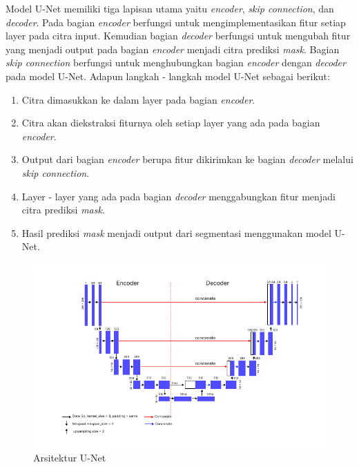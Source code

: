 
Model U-Net memiliki tiga lapisan utama yaitu \textit{encoder}, \textit{skip connection}, dan \textit{decoder}. Pada bagian \textit{encoder} berfungsi untuk mengimplementasikan fitur setiap layer pada citra input. Kemudian bagian \textit{decoder} berfungsi untuk mengubah fitur yang menjadi output pada bagian \textit{encoder} menjadi citra prediksi \textit{mask}. Bagian \textit{skip connection} berfungsi untuk menghubungkan bagian \textit{encoder} dengan \textit{decoder} pada model U-Net. Adapun langkah - langkah model U-Net sebagai berikut:
\begin{enumerate}
    \item Citra dimasukkan ke dalam layer pada bagian \textit{encoder}.
    \item Citra akan diekstraksi fiturnya oleh setiap layer yang ada pada bagian \textit{encoder}.
    \item Output dari bagian \textit{encoder} berupa fitur dikirimkan ke bagian \textit{decoder} melalui \textit{skip connection}.
    \item Layer - layer yang ada pada bagian \textit{decoder} menggabungkan fitur menjadi citra prediksi \textit{mask}.
    \item Hasil prediksi \textit{mask} menjadi output dari segmentasi menggunakan model U-Net.
\end{enumerate}

\begin{figure}[htbp]
	\centering
	\includegraphics[scale= 0.6]{bab2/mondelUnetBab2.png}
	\caption{Arsitektur U-Net}
	\label{fig:modelU-Net}
\end{figure}


